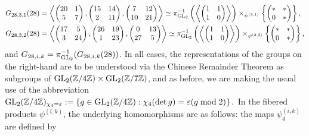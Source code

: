 \begin{equation}
\begin{split}
G_{28,3,1}(28) &= \left\langle \begin{pmatrix} 20 & 1 \\ 5 & 7 \end{pmatrix}, \begin{pmatrix} 15 & 14 \\ 2 & 11 \end{pmatrix}, \begin{pmatrix} 7 & 12 \\ 10 & 21 \end{pmatrix} \right\rangle \simeq \pi_{\operatorname{GL}_2}^{-1} \left( \left\langle \begin{pmatrix} 1 & 1 \\ 1 & 0 \end{pmatrix} \right\rangle \right) \times_{\psi^{(3,1)}} \left\{ \begin{pmatrix} * & * \\ 0 & * \end{pmatrix} \right\}, \\
G_{28,3,2}(28) &= \left\langle \begin{pmatrix} 17 & 5 \\ 3 & 24 \end{pmatrix}, \begin{pmatrix} 26 & 19 \\ 1 & 23 \end{pmatrix}, \begin{pmatrix} 0 & 13 \\ 27 & 5 \end{pmatrix} \right\rangle \simeq \pi_{\operatorname{GL}_2}^{-1} \left( \left\langle \begin{pmatrix} 1 & 1 \\ 1 & 0 \end{pmatrix} \right\rangle \right) \times_{\psi^{(3,2)}} \left\{ \begin{pmatrix} * & * \\ 0 & * \end{pmatrix} \right\},
\end{split}
\end{equation}
and $G_{28,i,k} = \pi_{\operatorname{GL}_2}^{-1}(G_{28,i,k}(28))$. In all cases, the representations of the groups on the right-hand are to be understood via the Chinese Remainder Theorem as subgroups of $\operatorname{GL}_2(\mathbb{Z}/4\mathbb{Z}) \times \operatorname{GL}_2(\mathbb{Z}/7\mathbb{Z})$, and as before, we are making the usual use of the abbreviation
$
\operatorname{GL}_2(\mathbb{Z}/4\mathbb{Z})_{\chi_4 = \varepsilon} := \left\{ g \in \operatorname{GL}_2(\mathbb{Z}/4\mathbb{Z}) : \chi_4(\det g) = \varepsilon(g \bmod 2 ) \right\}.
$
In the fibered products $\psi^{(i,k)}$, the underlying homomorphisms are as follows: the maps $\psi_4^{(i,k)}$ are defined by

